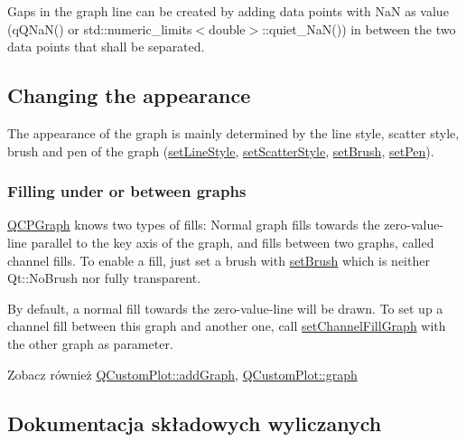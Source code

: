 Gaps in the graph line can be created by adding data points with NaN as value ({\ttfamily q\+Q\+Na\+N()} or {\ttfamily std\+::numeric\+\_\+limits$<$double$>$\+::quiet\+\_\+\+Na\+N()}) in between the two data points that shall be separated.\hypertarget{class_q_c_p_graph_qcpgraph-appearance}{}\subsection{Changing the appearance}\label{class_q_c_p_graph_qcpgraph-appearance}
The appearance of the graph is mainly determined by the line style, scatter style, brush and pen of the graph (\hyperlink{class_q_c_p_graph_a513fecccff5b2a50ce53f665338c60ff}{set\+Line\+Style}, \hyperlink{class_q_c_p_graph_a12bd17a8ba21983163ec5d8f42a9fea5}{set\+Scatter\+Style}, \hyperlink{class_q_c_p_abstract_plottable_a7a4b92144dca6453a1f0f210e27edc74}{set\+Brush}, \hyperlink{class_q_c_p_abstract_plottable_ab74b09ae4c0e7e13142fe4b5bf46cac7}{set\+Pen}).\hypertarget{class_q_c_p_graph_filling}{}\subsubsection{Filling under or between graphs}\label{class_q_c_p_graph_filling}
\hyperlink{class_q_c_p_graph}{Q\+C\+P\+Graph} knows two types of fills\+: Normal graph fills towards the zero-\/value-\/line parallel to the key axis of the graph, and fills between two graphs, called channel fills. To enable a fill, just set a brush with \hyperlink{class_q_c_p_abstract_plottable_a7a4b92144dca6453a1f0f210e27edc74}{set\+Brush} which is neither Qt\+::\+No\+Brush nor fully transparent.

By default, a normal fill towards the zero-\/value-\/line will be drawn. To set up a channel fill between this graph and another one, call \hyperlink{class_q_c_p_graph_a2d03156df1b64037a2e36cfa50351ca3}{set\+Channel\+Fill\+Graph} with the other graph as parameter.

\begin{DoxySeeAlso}{Zobacz również}
\hyperlink{class_q_custom_plot_a6fb2873d35a8a8089842d81a70a54167}{Q\+Custom\+Plot\+::add\+Graph}, \hyperlink{class_q_custom_plot_a6d3ed93c2bf46ab7fa670d66be4cddaf}{Q\+Custom\+Plot\+::graph} 
\end{DoxySeeAlso}


\subsection{Dokumentacja składowych wyliczanych}

